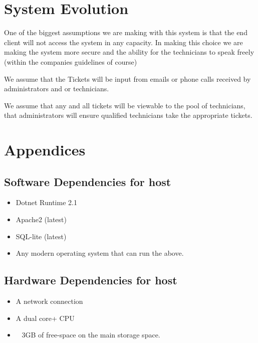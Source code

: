 \documentclass[letterpaper]{article}
\begin{document}
\pagebreak

\section{System Evolution}
One of the biggest assumptions we are making with this system is that the end client will not access the system in any capacity. In making this choice we are making the system more secure and the ability for the technicians to speak freely (within the companies guidelines of course)


We assume that the Tickets will be input from emails or phone calls received by administrators and or technicians. 

We assume that any and all tickets will be viewable to the pool of technicians, that administrators will ensure qualified technicians take the appropriate tickets.

\pagebreak

\section{Appendices}

\subsection{Software Dependencies for host}
  \begin{itemize}
    \item Dotnet Runtime 2.1
    \item Apache2 (latest)
    \item SQL-lite (latest)
    \item Any modern operating system that can run the above.
  \end{itemize}

\subsection{Hardware Dependencies for host}
  \begin{itemize}
    \item A network connection
    \item A dual core+ CPU
    \item ~ 3GB of free-space on the main storage space.
  \end{itemize}
\end{document}
